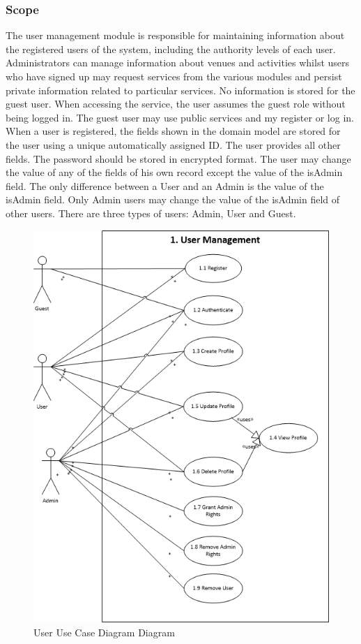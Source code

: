 \documentclass{article}
\begin{document}
\subsubsection{Scope}
The user management module is responsible for maintaining information about the registered
users of the system, including the authority levels of each user. Administrators can
manage information about venues and activities whilst users who have signed up
may request services from the various modules and persist private information
related to particular services.\newline
No information is stored for the guest user. When accessing the service, the user
assumes the guest role without being logged in. The guest user may use public
services and my register or log in.
When a user is registered, the fields shown in the domain model are stored for the
user using a unique automatically assigned ID. The user provides all other fields. The
password should be stored in encrypted format. The user may change the value of
any of the fields of his own record except the value of the isAdmin field.
The only difference between a User and an Admin is the value of the isAdmin field.
Only Admin users may change the value of the isAdmin field of other users.
There are three types of users: Admin, User and Guest.

	\begin{figure}[h!]
      \includegraphics[width=\textwidth]{User_Subsystem_Use_Case_Diagram.png}
      \caption{User Use Case Diagram Diagram}
    \end{figure}
\end{document}
